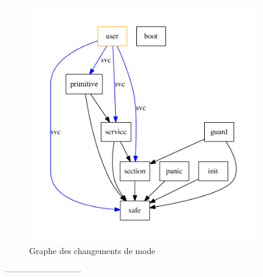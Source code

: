 \begin{figure}[t]
  \centering
  \includegraphics[width=10cm]{chapitres/changement-modes.pdf}
%
  \caption{Graphe des changements de mode}
  \ligne
\end{figure}


---------------------------







